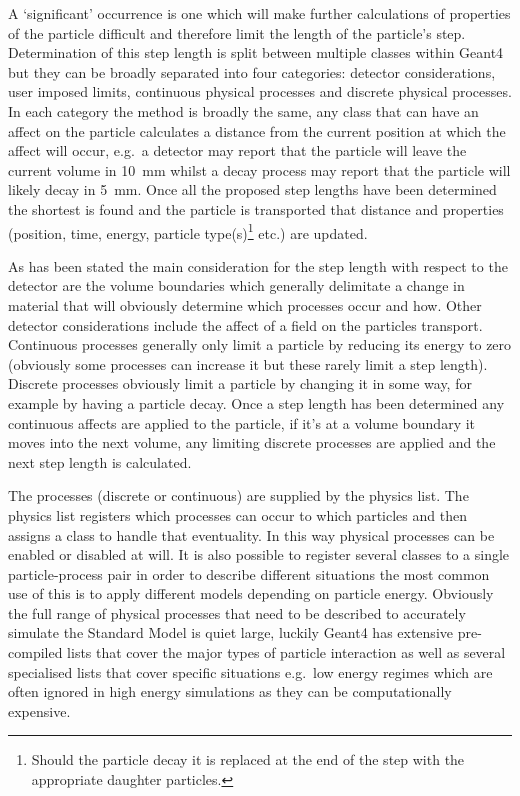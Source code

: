 A `significant' occurrence is one which will make further calculations of properties of the particle difficult and therefore limit the length of the particle's step. Determination of this step length is split between multiple classes within Geant4 but they can be broadly separated into four categories: detector considerations, user imposed limits, continuous physical processes and discrete physical processes. In each category the method is broadly the same, any class that can have an affect on the particle calculates a distance from the current position at which the affect will occur, e.g.\ a detector may report that the particle will leave the current volume in 10~mm whilst a decay process may report that the particle will likely decay in 5~mm. Once all the proposed step lengths have been determined the shortest is found and the particle is transported that distance and properties (position, time, energy, particle type(s)\footnote{Should the particle decay it is replaced at the end of the step with the appropriate daughter particles.} etc.) are updated. 

As has been stated the main consideration for the step length with respect to the detector are the volume boundaries which generally delimitate a change in material that will obviously determine which processes occur and how. Other detector considerations include the affect of a field on the particles transport. Continuous processes generally only limit a particle by reducing its energy to zero (obviously some processes can increase it but these rarely limit a step length). Discrete processes obviously limit a particle by changing it in some way, for example by having a particle decay. Once a step length has been determined any continuous affects are applied to the particle, if it's at a volume boundary it moves into the next volume, any limiting discrete processes are applied and the next step length is calculated. 

The processes (discrete or continuous) are supplied by the physics list. The physics list registers which processes can occur to which particles and then assigns a class to handle that eventuality. In this way physical processes can be enabled or disabled at will. It is also possible to register several classes to a single particle-process pair in order to describe different situations the most common use of this is to apply different models depending on particle energy. Obviously the full range of physical processes that need to be described to accurately simulate the Standard Model is quiet large, luckily Geant4 has extensive pre-compiled lists that cover the major types of particle interaction as well as several specialised lists that cover specific situations e.g.\ low energy regimes which are often ignored in high energy simulations as they can be computationally expensive. 

